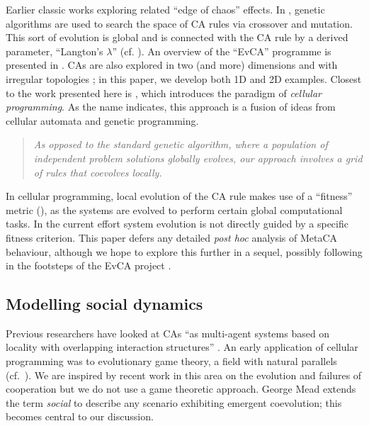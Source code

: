\documentclass{AISB2008}
\newcommand*{\sourceatright}[1]{\unskip\hspace{1em plus 1fill}%
\nolinebreak[3]\hspace*{\fill}\mbox{#1}}%
\begin{document}
Earlier classic works
\cite{langton1990computation,mitchell1993revisiting,packard1988adaptation}
exploring related ``edge of chaos'' effects.  In
\cite{packard1988adaptation,mitchell1993revisiting,mitchell1994evolving},
genetic algorithms are used to search the space of CA rules via
crossover and mutation.  This sort of evolution is global and is
connected with the CA rule by a derived parameter, ``Langton's
$\lambda$'' (cf. \cite{langton1990computation}).  An overview of the
``EvCA'' programme is presented in \cite{hordijk2013evca}.
%
CAs are also explored in two (and more) dimensions and with irregular topologies \cite{conway,flache2001irregular}; in this paper, we develop both 1D and 2D examples.
Closest to the work presented here is \cite{sipper1997evolution},
which introduces the paradigm of \emph{cellular programming}.  As the
name indicates, this approach is a fusion of ideas from cellular
automata and genetic programming.
\begin{quote}
\emph{As opposed to the standard genetic algorithm, where a population
  of independent problem solutions globally evolves, our approach
  involves a grid of rules that coevolves locally.}
\sourceatright{\cite[p. 74]{sipper1997evolution}}
\end{quote}
In cellular programming, local evolution of the CA rule makes use of a
``fitness'' metric (\cite[pp. 79--81]{sipper1997evolution}), as the
systems are evolved to perform certain global computational tasks.
%
In the current effort system evolution is not directly guided by a
specific fitness criterion.
%
This paper defers any detailed \emph{post hoc} analysis of MetaCA
behaviour, although we hope to explore this further in a sequel,
possibly following in the footsteps of the EvCA project
\cite{goerg2012licors,goerg2012mixed,hordijk2001upper}.

\subsection{Modelling social dynamics}

Previous researchers have looked at CAs ``as multi-agent systems based
on locality with overlapping interaction structures''
\cite{flache2001irregular}.  An early application of cellular
programming was to evolutionary game theory, a field with natural
parallels (cf.~\cite{nowak1992evolutionary}).  We are inspired by
recent work in this area on the evolution and failures of cooperation
\cite{axelrod-evolution,nowak2006five,stewart2013extortion,stewart2014collapse}
but we do not use a game theoretic approach.
%
George Mead extends the term \emph{social} to describe any scenario
exhibiting emergent coevolution; this becomes central to our discussion.
\end{document}
